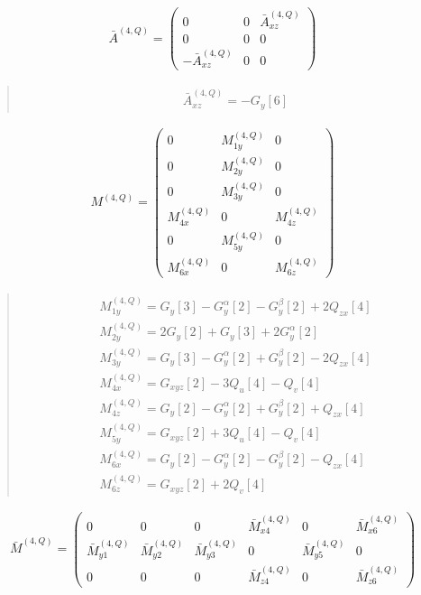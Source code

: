 \documentclass[fleqn,10pt]{jsarticle}
\begin{document}
\begin{align*}
\bar{A}^{(4,Q)} = \begin{pmatrix} 0 & 0 & \bar{A}^{(4,Q)}_{xz} \\ 0 & 0 & 0 \\ - \bar{A}^{(4,Q)}_{xz} & 0 & 0 \end{pmatrix}
\end{align*}
\begin{quote}
\begin{align*}
& \bar{A}^{(4,Q)}_{xz} = - G_{y}[6]
\end{align*}
\end{quote}
\begin{align*}
M^{(4,Q)} = \begin{pmatrix} 0 & M^{(4,Q)}_{1y} & 0 \\ 0 & M^{(4,Q)}_{2y} & 0 \\ 0 & M^{(4,Q)}_{3y} & 0 \\ M^{(4,Q)}_{4x} & 0 & M^{(4,Q)}_{4z} \\ 0 & M^{(4,Q)}_{5y} & 0 \\ M^{(4,Q)}_{6x} & 0 & M^{(4,Q)}_{6z} \end{pmatrix}
\end{align*}
\begin{quote}
\begin{align*}
& M^{(4,Q)}_{1y} = G_{y}[3] - G_{y}^{\alpha}[2] - G_{y}^{\beta}[2] + 2 Q_{zx}[4] \\
& M^{(4,Q)}_{2y} = 2 G_{y}[2] + G_{y}[3] + 2 G_{y}^{\alpha}[2] \\
& M^{(4,Q)}_{3y} = G_{y}[3] - G_{y}^{\alpha}[2] + G_{y}^{\beta}[2] - 2 Q_{zx}[4] \\
& M^{(4,Q)}_{4x} = G_{xyz}[2] - 3 Q_{u}[4] - Q_{v}[4] \\
& M^{(4,Q)}_{4z} = G_{y}[2] - G_{y}^{\alpha}[2] + G_{y}^{\beta}[2] + Q_{zx}[4] \\
& M^{(4,Q)}_{5y} = G_{xyz}[2] + 3 Q_{u}[4] - Q_{v}[4] \\
& M^{(4,Q)}_{6x} = G_{y}[2] - G_{y}^{\alpha}[2] - G_{y}^{\beta}[2] - Q_{zx}[4] \\
& M^{(4,Q)}_{6z} = G_{xyz}[2] + 2 Q_{v}[4]
\end{align*}
\end{quote}
\begin{align*}
\bar{M}^{(4,Q)} = \begin{pmatrix} 0 & 0 & 0 & \bar{M}^{(4,Q)}_{x4} & 0 & \bar{M}^{(4,Q)}_{x6} \\ \bar{M}^{(4,Q)}_{y1} & \bar{M}^{(4,Q)}_{y2} & \bar{M}^{(4,Q)}_{y3} & 0 & \bar{M}^{(4,Q)}_{y5} & 0 \\ 0 & 0 & 0 & \bar{M}^{(4,Q)}_{z4} & 0 & \bar{M}^{(4,Q)}_{z6} \end{pmatrix}
\end{align*}
\end{document}

